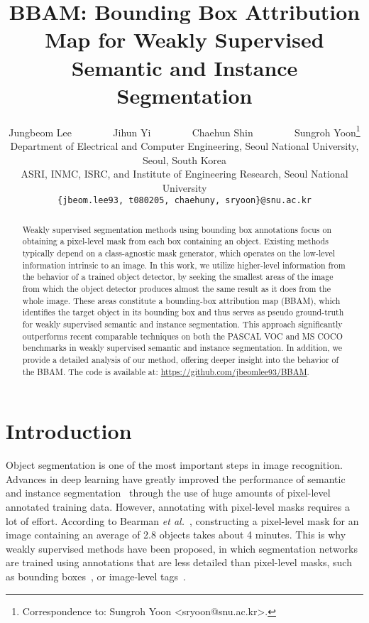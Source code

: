 \documentclass[final]{cvpr}
\begin{document}
\title{BBAM: Bounding Box Attribution Map for Weakly Supervised \\Semantic and Instance Segmentation}


\author{Jungbeom Lee ~~~~~~~ Jihun Yi ~~~~~~~ Chaehun Shin  ~~~~~~~  Sungroh Yoon\thanks{Correspondence to: Sungroh Yoon <sryoon@snu.ac.kr>.}\\
 Department of Electrical and Computer Engineering, Seoul National University, Seoul, South Korea\\
 ASRI, INMC, ISRC, and Institute of Engineering Research, Seoul National University\\
{\tt\small \{jbeom.lee93, t080205, chaehuny, sryoon\}@snu.ac.kr}}

\maketitle


\begin{abstract}
Weakly supervised segmentation methods using bounding box annotations focus on obtaining a pixel-level mask from each box containing an object. Existing methods typically depend on a class-agnostic mask generator, which operates on the low-level information intrinsic to an image. In this work, we utilize higher-level information from the behavior of a trained object detector, by seeking the smallest areas of the image from which the object detector produces almost the same result as it does from the whole image. These areas constitute a bounding-box attribution map (BBAM), which identifies the target object in its bounding box and thus serves as pseudo ground-truth for weakly supervised semantic and instance segmentation. This approach significantly outperforms recent comparable techniques on both the PASCAL VOC and MS COCO benchmarks in weakly supervised semantic and instance segmentation. In addition, we provide a detailed analysis of our method, offering deeper insight into the behavior of the BBAM.
The code is available at: \url{https://github.com/jbeomlee93/BBAM}.

\end{abstract}

\thispagestyle{empty}
\section{Introduction}
Object segmentation is one of the most important steps in image recognition.
Advances in deep learning have greatly improved the performance of semantic and instance segmentation~\cite{he2017mask, chen2017deeplab} through the use of huge amounts of pixel-level annotated training data. 
However, annotating with pixel-level masks requires a lot of effort. According to Bearman \textit{et al.}~\cite{bearman2016s}, constructing a pixel-level mask for an image containing an average of 2.8 objects takes about 4 minutes.
This is why weakly supervised methods have been proposed, in which segmentation networks are trained using annotations that are less detailed than pixel-level masks, such as bounding boxes~\cite{song2019box, khoreva2017simple, dai2015boxsup}, or image-level tags~\cite{lee2019ficklenet, ahn2019weakly, ahn2018learning}.
\end{document}

